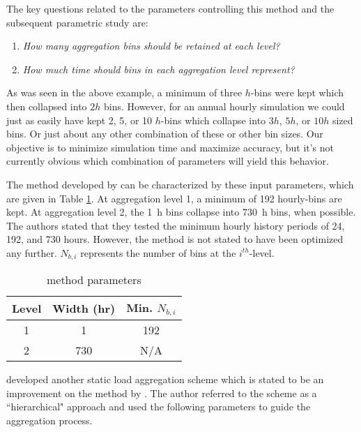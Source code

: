 \documentclass[review,12pt]{elsarticle}
\begin{document}
The key questions related to the parameters controlling this method and the subsequent parametric study are:

\begin{enumerate}
    \item \textit{How many aggregation bins should be retained at each level?}
    \item \textit{How much time should bins in each aggregation level represent?}
\end{enumerate}

As was seen in the above example, a minimum of three $h$-bins were kept which then collapsed into $2h$ bins. However, for an annual hourly simulation we could just as easily have kept 2, 5, or 10 $h$-bins which collapse into $3h$, $5h$, or $10h$ sized bins. Or just about any other combination of these or other bin sizes. Our objective is to minimize simulation time and maximize accuracy, but it's not currently obvious which combination of parameters will yield this behavior.

The method developed by \cite{YavuzturkSpitler1999} can be characterized by these input parameters, which are given in Table \ref{tab:yavuzturk parameters}. At aggregation level 1, a minimum of 192 hourly-bins are kept. At aggregation level 2, the \SI{1}{\hour} bins collapse into \SI{730}{\hour} bins, when possible. The authors stated that they tested the minimum hourly history periods of 24, 192, and 730 hours. However, the method is not stated to have been optimized any further. $N_{b,i}$ represents the number of bins at the $i^{th}$-level.

\begin{table}[htbp!]
\centering
\caption{\cite{YavuzturkSpitler1999} method parameters}
\label{tab:yavuzturk parameters}
\begin{tabular}{|c|c|c|}
\hline
Level & Width (hr) & Min. $N_{b,i}$ \\ \hline \hline
1     & 1          & 192       \\ \hline
2     & 730        & N/A       \\ \hline
\end{tabular}
\end{table}

\cite{Liu2005} developed another static load aggregation scheme which is stated to be an improvement on the method by \cite{YavuzturkSpitler1999}. The author referred to the scheme as a ``hierarchical" approach and used the following parameters to guide the aggregation process.
\end{document}
